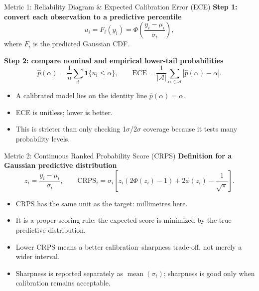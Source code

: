 \documentclass[UTF8,aspectratio=169]{ctexbeamer}
\begin{document}
\begin{frame}{Metric 1: Reliability Diagram \& Expected Calibration Error (ECE)}
\small
\textbf{Step 1: convert each observation to a predictive percentile}
\[
u_i = F_i(y_i) =
\Phi\!\left(\frac{y_i-\mu_i}{\sigma_i}\right),
\]
where \(F_i\) is the predicted Gaussian CDF.

\textbf{Step 2: compare nominal and empirical lower-tail probabilities}
\[
\hat p(\alpha)=\frac{1}{n}\sum_i \mathbf{1}\{u_i\leq\alpha\},
\qquad
\mathrm{ECE}=\frac{1}{|\mathcal{A}|}\sum_{\alpha\in\mathcal{A}}
|\hat p(\alpha)-\alpha|.
\]

\vspace{0.2em}
\begin{itemize}
    \item A calibrated model lies on the identity line \(\hat p(\alpha)=\alpha\).
    \item ECE is unitless; lower is better.
    \item This is stricter than only checking 1\(\sigma\)/2\(\sigma\) coverage because it tests many probability levels.
\end{itemize}
\end{frame}

\begin{frame}{Metric 2: Continuous Ranked Probability Score (CRPS)}
\small
\textbf{Definition for a Gaussian predictive distribution}
\[
z_i=\frac{y_i-\mu_i}{\sigma_i},
\qquad
\mathrm{CRPS}_i
=\sigma_i\left[
z_i(2\Phi(z_i)-1)+2\phi(z_i)-\frac{1}{\sqrt{\pi}}
\right].
\]

\vspace{0.2em}
\begin{itemize}
    \item CRPS has the same unit as the target: millimetres here.
    \item It is a proper scoring rule: the expected score is minimized by the true predictive distribution.
    \item Lower CRPS means a better calibration--sharpness trade-off, not merely a wider interval.
    \item Sharpness is reported separately as \(\operatorname{mean}(\sigma_i)\); sharpness is good only when calibration remains acceptable.
\end{itemize}
\end{frame}
\end{document}
